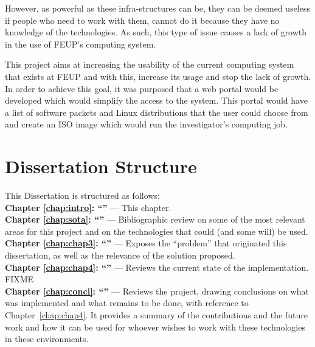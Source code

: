 However, as powerful as these infra-structures can be, they can be deemed useless if people who need to work with them, cannot do it because they have no knowledge of the technologies. As such, this type of issue causes a lack of growth in the use of FEUP's computing system.

This project aims at increasing the usability of the current computing system that exists at FEUP and with this, increase its usage and stop the lack of growth. In order to achieve this goal, it was purposed that a web portal would be developed which would simplify the access to the system. This portal would have a list of software packets and Linux distributions that the user could choose from and create an ISO image which would run the investigator's computing job.

\section{Dissertation Structure} \label{sec:structure}

This Dissertation is structured as follows:\\
\textbf{Chapter \ref{chap:intro}: ``'' } --- This chapter.\\
\textbf{Chapter \ref{chap:sota}: ``'' } --- Bibliographic review on some of the most relevant areas for this project and on the technologies that could (and some will) be used.\\
\textbf{Chapter \ref{chap:chap3}: ``'' } --- Exposes the ``problem'' that originated this dissertation, as well as the relevance of the solution proposed.\\
\textbf{Chapter \ref{chap:chap4}: ``'' } --- Reviews the current state of the implementation. FIXME\\
\textbf{Chapter \ref{chap:concl}: ``'' } --- Reviews the project, drawing conclusions on what was implemented and what remains to be done, with reference to Chapter~\ref{chap:chap4}. It provides a summary of the contributions and the future work and how it can be used for whoever wishes to work with these technologies in these environments.\\


